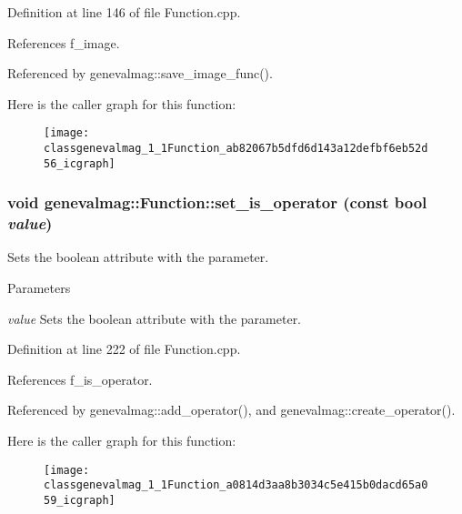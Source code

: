 Definition at line 146 of file Function.cpp.



References f\_\-image.



Referenced by genevalmag::save\_\-image\_\-func().



Here is the caller graph for this function:\nopagebreak
\begin{figure}[H]
\begin{center}
\leavevmode
\texttt{[image: classgenevalmag\_1\_1Function\_ab82067b5dfd6d143a12defbf6eb52d56\_icgraph]}
\end{center}
\end{figure}


\hypertarget{classgenevalmag_1_1Function_a0814d3aa8b3034c5e415b0dacd65a059}{
\subsubsection[{set\_\-is\_\-operator}]{\setlength{\rightskip}{0pt plus 5cm}void genevalmag::Function::set\_\-is\_\-operator (const bool {\em value})}}
\label{classgenevalmag_1_1Function_a0814d3aa8b3034c5e415b0dacd65a059}
Sets the boolean attribute with the parameter. 
\begin{DoxyParams}{Parameters}
\item[{\em value}]Sets the boolean attribute with the parameter. \end{DoxyParams}


Definition at line 222 of file Function.cpp.



References f\_\-is\_\-operator.



Referenced by genevalmag::add\_\-operator(), and genevalmag::create\_\-operator().



Here is the caller graph for this function:\nopagebreak
\begin{figure}[H]
\begin{center}
\leavevmode
\texttt{[image: classgenevalmag\_1\_1Function\_a0814d3aa8b3034c5e415b0dacd65a059\_icgraph]}
\end{center}
\end{figure}


